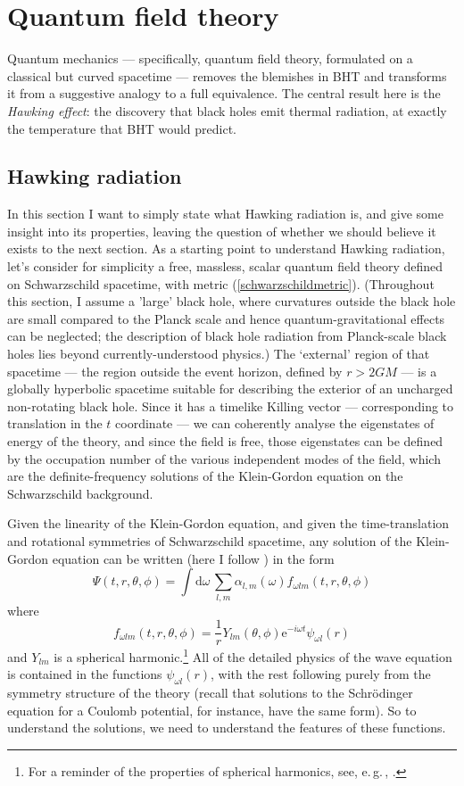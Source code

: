\documentclass[12pt]{article}
\newcommand{\egc}{\mbox{e.\,g.\,}}
\newcommand{\dr}[1]{\ensuremath{\mathrm{d} #1\,}}
\newcommand{\be}{\begin{equation}}
\newcommand{\ee}{\end{equation}}
\newcommand{\e}[1]{\mathrm{e}^{#1}}
\begin{document}
\section{Quantum field theory}\label{quantum}

Quantum mechanics --- specifically, quantum field theory, formulated on a classical but curved spacetime --- removes the blemishes in BHT and transforms it from a suggestive analogy to a full equivalence. The central result here is the \emph{Hawking effect}: the discovery that black holes emit thermal radiation, at exactly the temperature that BHT would predict.
 
\subsection{Hawking radiation}

In this section I want to simply state what Hawking radiation is, and give some insight into its properties, leaving the question of whether we should believe it exists to the next section.
As a starting point to understand Hawking radiation, let's consider for simplicity a free, massless, scalar quantum field theory defined on Schwarzschild spacetime, with metric (\ref{schwarzschildmetric}). (Throughout this section, I assume a 'large' black hole, where curvatures outside the black hole are small compared to the Planck scale and hence quantum-gravitational effects can be neglected; the description of black hole radiation from Planck-scale black holes lies beyond currently-understood physics.)  The `external' region of that spacetime --- the region outside the event horizon, defined by $r>2GM$ --- is a globally hyperbolic spacetime suitable for describing the exterior of an uncharged non-rotating black hole. Since it has a timelike Killing vector --- corresponding to translation in the $t$ coordinate --- we can coherently analyse the eigenstates of energy of the theory, and since the field is free, those eigenstates can be defined by the occupation number of the various independent modes of the field, which are the definite-frequency solutions of the Klein-Gordon equation on the Schwarzschild background.

Given the linearity of the Klein-Gordon equation, and given the time-translation and rotational symmetries of Schwarzschild spacetime, any solution of the Klein-Gordon equation can be written (here I follow ) in the form
\be
\Psi(t,r,\theta,\phi)=\int \dr{\omega}\sum_{l,m} \alpha_{l,m}(\omega) f_{\omega l m}(t,r,\theta,\phi)
\ee
where
\be
f_{\omega l m}(t,r,\theta, \phi)= \frac{1}{r}Y_{lm}(\theta,\phi)\e{-i \omega t} \psi_{\omega l}(r)
\ee
and $Y_{lm}$ is a spherical harmonic.\footnote{For a reminder of the properties of spherical harmonics, see, \egc, .} All of the detailed physics of the wave equation is contained in the functions $\psi_{\omega l}(r)$, with the rest following purely from the symmetry structure of the theory (recall that solutions to the Schr\"{o}dinger equation for a Coulomb potential, for instance, have the same form). So to understand the solutions, we need to understand the features of these functions.
\end{document}
